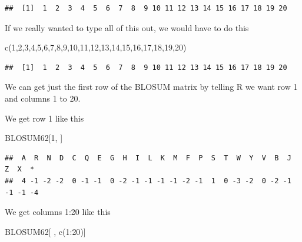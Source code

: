 \documentclass[
]{book}
\newenvironment{Shaded}{\begin{snugshade}}{\end{snugshade}}
\newcommand{\DecValTok}[1]{\textcolor[rgb]{0.00,0.00,0.81}{#1}}
\newcommand{\FunctionTok}[1]{\textcolor[rgb]{0.00,0.00,0.00}{#1}}
\newcommand{\NormalTok}[1]{#1}
\newcommand{\SpecialCharTok}[1]{\textcolor[rgb]{0.00,0.00,0.00}{#1}}
\begin{document}
\begin{verbatim}
##  [1]  1  2  3  4  5  6  7  8  9 10 11 12 13 14 15 16 17 18 19 20
\end{verbatim}

If we really wanted to type all of this out, we would have to do this

\begin{Shaded}
\begin{Highlighting}[]
\FunctionTok{c}\NormalTok{(}\DecValTok{1}\NormalTok{,}\DecValTok{2}\NormalTok{,}\DecValTok{3}\NormalTok{,}\DecValTok{4}\NormalTok{,}\DecValTok{5}\NormalTok{,}\DecValTok{6}\NormalTok{,}\DecValTok{7}\NormalTok{,}\DecValTok{8}\NormalTok{,}\DecValTok{9}\NormalTok{,}\DecValTok{10}\NormalTok{,}\DecValTok{11}\NormalTok{,}\DecValTok{12}\NormalTok{,}\DecValTok{13}\NormalTok{,}\DecValTok{14}\NormalTok{,}\DecValTok{15}\NormalTok{,}\DecValTok{16}\NormalTok{,}\DecValTok{17}\NormalTok{,}\DecValTok{18}\NormalTok{,}\DecValTok{19}\NormalTok{,}\DecValTok{20}\NormalTok{)}
\end{Highlighting}
\end{Shaded}

\begin{verbatim}
##  [1]  1  2  3  4  5  6  7  8  9 10 11 12 13 14 15 16 17 18 19 20
\end{verbatim}

We can get just the first row of the BLOSUM matrix by telling R we want row 1 and columns 1 to 20.

We get row 1 like this

\begin{Shaded}
\begin{Highlighting}[]
\NormalTok{BLOSUM62[}\DecValTok{1}\NormalTok{, ]}
\end{Highlighting}
\end{Shaded}

\begin{verbatim}
##  A  R  N  D  C  Q  E  G  H  I  L  K  M  F  P  S  T  W  Y  V  B  J  Z  X  * 
##  4 -1 -2 -2  0 -1 -1  0 -2 -1 -1 -1 -1 -2 -1  1  0 -3 -2  0 -2 -1 -1 -1 -4
\end{verbatim}

We get columns 1:20 like this

\begin{Shaded}
\begin{Highlighting}[]
\NormalTok{BLOSUM62[ , }\FunctionTok{c}\NormalTok{(}\DecValTok{1}\SpecialCharTok{:}\DecValTok{20}\NormalTok{)]}
\end{Highlighting}
\end{Shaded}
\end{document}
